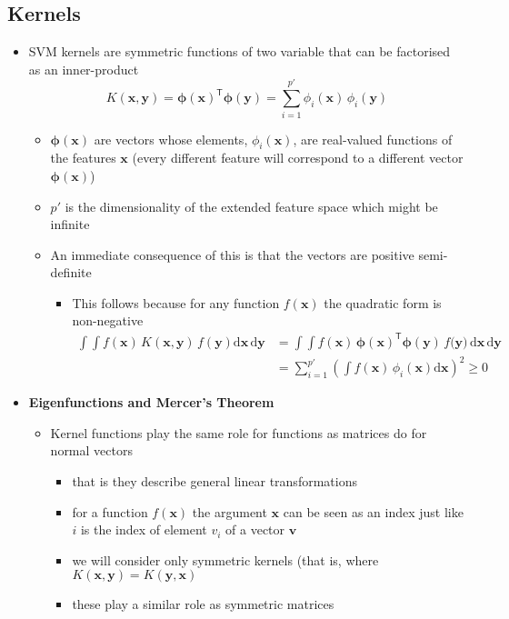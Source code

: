 \documentclass[11pt]{article}
\newcommand{\tr}{\textsf{T}}
\newcommand{\dd}{\mathrm{d}}
\begin{document}
\subsection{Kernels}
\label{sec:orga571295}
\begin{itemize}
\item SVM kernels are symmetric functions of two variable that can be
factorised as an inner-product
$$  K(\bm{x},\bm{y}) = \bm{\phi}(\bm{x})^\tr\bm{\phi}(\bm{y}) =
     \sum_{i=1}^{p'} \phi_i(\bm{x})\,\phi_i(\bm{y})$$
\begin{itemize}
\item \(\bm{\phi}(\bm{x})\) are vectors whose elements,
\(\phi_i(\bm{x})\), are real-valued functions of
the features \(\bm{x}\) (every different feature will correspond
to a different vector \(\bm{\phi}(\bm{x})\))
\item \(p'\) is the dimensionality of the extended feature space which
might be infinite
\item An immediate consequence of this is that the vectors are
positive semi-definite
\begin{itemize}
\item This follows because for any function \(f(\bm{x})\) the
quadratic form is non-negative 
\begin{align*}
\int\!\! \int f(\bm{x})\,K(\bm{x},\bm{y}) \, f(\bm{y}) \dd \bm{x}\, \dd \bm{y}
&= \int\!\! \int f(\bm{x})\, \bm{\phi}(\bm{x})^\tr\bm{\phi}(\bm{y})\, f(\bm{y)}\, \dd \bm{x}\, \dd \bm{y}\\
&=\sum_{i=1}^{p'}  \left(\int f(\bm{x})\, \phi_i(\bm{x}) \dd
\bm{x}\right)^2 \geq 0
\end{align*}
\end{itemize}
\end{itemize}
\item \textbf{Eigenfunctions and Mercer's Theorem}
\begin{itemize}
\item Kernel functions play the same role for functions as matrices
do for normal vectors
\begin{itemize}
\item that is they describe general linear transformations
\item for a function \(f(\bm{x})\) the argument \(\bm{x}\) can be seen
as an index just like \(i\) is the index of element \(v_i\) of a
vector \(\bm{v}\)
\item we will consider only symmetric kernels (that is, where
\(K(\bm{x},\bm{y})=K(\bm{y},\bm{x})\)
\item these play a similar role as symmetric matrices

\end{itemize}
\end{itemize}
\end{itemize}
\end{document}
